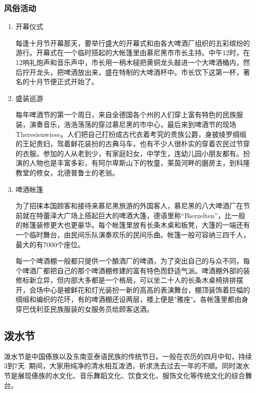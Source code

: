 \subsubsection{风俗活动}
\begin{enumerate}
    
\item 开幕仪式

每逢十月节开幕那天，要举行盛大的开幕式和由各大啤酒厂组织的五彩缤纷的游行。开幕式在一个临时搭起的大帐篷里由慕尼黑市市长主持。中午12时，在12响礼炮声和音乐声中，市长用一柄木槌把黄铜龙头敲进一个大啤酒桶内，然后拧开龙头，把啤酒放出来，盛在特制的大啤酒杯中。市长饮下这第一杯，著名的十月节便正式开始了。

\item 盛装巡游 

每年啤酒节的第一个周日，来自全德国各个州的人们穿上富有特色的民族服装，演奏音乐，浩浩荡荡的穿过慕尼黑的市中心，最后来到啤酒节的现场Theresienwiese。人们把自己打扮成古代衣着考究的贵族公爵，身披绫罗绸缎的王妃贵妇，驾着鲜花装扮的古典马车，也有不少人很朴实的穿着农民过节穿的衣服。参加的人从老到少，有家庭妇女，中学生，连幼儿园小朋友都有。扮演的人物也是丰富多彩，有阿尔卑斯山下的牧童，莱茵河畔的磨房主，到科隆教堂的修女，北德普鲁士的老翁。

\item 啤酒帐篷

为了招徕本国顾客和接待来慕尼黑旅游的外国客人，慕尼黑的八大啤酒厂在节前就在特蕾泽大广场上搭起巨大的啤酒大篷，德语里称“Bierzelten”，比一般的帐篷装修更大也更豪华。每个帐篷里放有长条木桌和板凳，大篷的一端还有一个临时舞台，由民间乐队演奏欢乐的民间乐曲。帐篷一般可容纳三四千人，最大的有7000个座位。

每一个啤酒棚一般都只提供一个酿酒厂的啤酒，为了突出自己的与众不同，每个啤酒厂都把自己的那个啤酒棚修建的富有特色而舒适气派。啤酒棚外部的装修标新立异，但内部大多都是一个格局，可以坐二十人的长条木桌椅排排摆开，会场中心是被鲜花和灯光装扮一新的高高的表演舞台，棚顶装饰着巨幅的绸缎和编织的花环，有的啤酒棚还设两层，楼上便是"雅座"。各帐篷里都由身穿巴伐利亚民族服装的女服务员给顾客送酒。
\end{enumerate}

\subsection{泼水节}

泼水节是中国傣族以及东南亚泰语民族的传统节日。一般在农历的四月中旬，持续3到7天. 期间，大家用纯净的清水相互泼洒，祈求洗去过去一年的不顺。同时泼水节是展现傣族的水文化、音乐舞蹈文化、饮食文化、服饰文化等传统文化的综合舞台。

